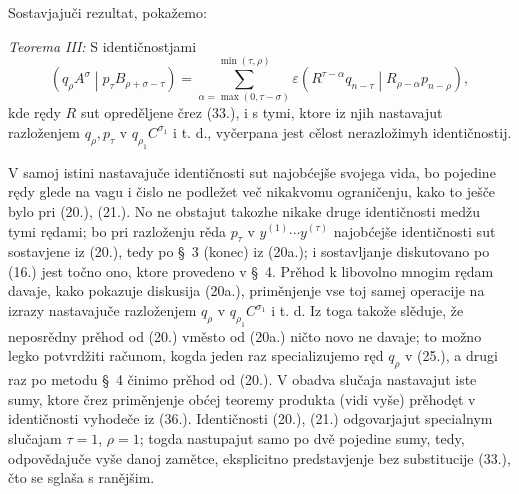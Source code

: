\documentclass[11pt]{article}
\newcommand{\pair}[2]{\left(#1\middle|#2\right)}
\newcommand{\eps}{\varepsilon}
\begin{document}
Sostavjajuči rezultat, pokažemo:

\emph{Teorema III:} S identičnostjami
\begin{equation}
 \pair{q_\rho A^\sigma}{p_\tau B_{\rho+\sigma-\tau}}
 =\sum_{\alpha=\max(0,\tau-\sigma)}^{\min(\tau,\rho)}
 \eps\pair{R^{\tau-\alpha}q_{n-\tau}}{R_{\rho-\alpha}p_{n-\rho}},
\tag{36}
\end{equation}
kde rędy $R$ sut opreděljene črez (33.), i s tymi, ktore iz njih nastavajut razloženjem $q_\rho,p_\tau$ v $q_{\rho_1}C^{\sigma_1}$ i t. d., vyčerpana jest cělost nerazložimyh identičnostij.

V samoj istini nastavajuče identičnosti sut najobćejše svojega vida, bo pojedine rędy glede na vagu i čislo ne podležet več nikakvomu ograničenju, kako to ješče bylo pri (20.), (21.). No ne obstajut takozhe nikake druge identičnosti medžu tymi rędami; bo pri razloženju rěda $p_\tau$ v $y^{(1)}\cdots y^{(\tau)}$ najobćejše identičnosti sut sostavjene iz (20.), tedy po \S\ 3 (konec) iz (20a.); i sostavljanje diskutovano po (16.) jest točno ono, ktore provedeno v \S\ 4. Prěhod k libovolno mnogim rędam davaje, kako pokazuje diskusija (20a.), priměnjenje vse toj samej operacije na izrazy nastavajuče razloženjem $q_\rho$ v $q_{\rho_1}C^{\sigma_1}$ i t. d. Iz toga takože slěduje, že neposrědny prěhod od (20.) vměsto od (20a.) ničto novo ne davaje; to možno legko potvrdžiti računom, kogda jeden raz specializujemo ręd $q_\rho$ v (25.), a drugi raz po metodu \S\ 4 činimo prěhod od (20.). V obadva slučaja nastavajut iste sumy, ktore črez priměnjenje obćej teoremy produkta (vidi vyše) prěhodęt v identičnosti vyhodeče iz (36.). Identičnosti (20.), (21.) odgovarjajut specialnym slučajam $\tau=1$, $\rho=1$; togda nastupajut samo po dvě pojedine sumy, tedy, odpovědajuče vyše danoj zamětce, eksplicitno predstavjenje bez substitucije (33.), čto se sglaša s ranějšim.
\end{document}
